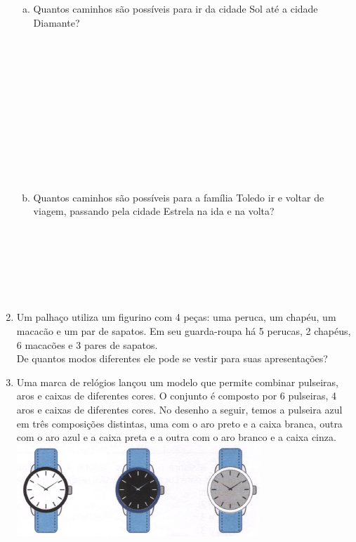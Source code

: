 \documentclass[a4paper,14pt]{article}
\begin{document}
\begin{multicols}{2}
\begin{enumerate}
			\begin{enumerate}[a)]
				\item Quantos caminhos são possíveis para ir da cidade Sol até a cidade Diamante? \\\\\\\\\\\\\\\\\\\\\\\\
				\item Quantos caminhos são possíveis para a família Toledo ir e voltar de viagem, passando pela cidade Estrela na ida e na volta? \\\\\\\\\\\\\\
			\end{enumerate}
			\item Um palhaço utiliza um figurino com 4 peças: uma peruca, um chapéu, um macacão e um par de sapatos. Em seu guarda-roupa há 5 perucas, 2 chapéus, 6 macacões e 3 pares de sapatos. \\ 
			De quantos modos diferentes ele pode se vestir para suas apresentações? \newpage
			\item Uma marca de relógios lançou um modelo que permite combinar pulseiras, aros e caixas de diferentes cores. O conjunto é composto por 6 pulseiras, 4 aros e caixas de diferentes cores. No desenho a seguir, temos a pulseira azul em três composições distintas, uma com o aro preto e a caixa branca, outra com o aro azul e a caixa preta e a outra com o aro branco e a caixa cinza. \\
			\includegraphics[width=1\linewidth]{6FMA112_imagens/imagem2}

\end{enumerate}
\end{multicols}
\end{document}
